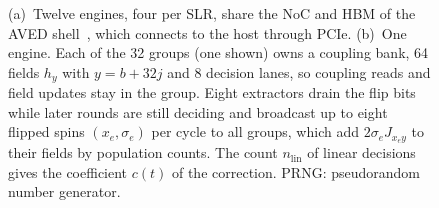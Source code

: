\begin{figure}[t]
\caption{(a)~Twelve engines, four per SLR, share the NoC and HBM of the AVED shell~\cite{amd_aved}, which connects to the host through PCIe. (b)~One engine. Each of the 32 groups (one shown) owns a coupling bank, 64 fields $h_y$ with $y=b+32j$ and 8 decision lanes, so coupling reads and field updates stay in the group. Eight extractors drain the flip bits while later rounds are still deciding and broadcast up to eight flipped spins $(x_e,\sigma_e)$ per cycle to all groups, which add $2\sigma_e J_{x_e y}$ to their fields by population counts. The count $n_{\mathrm{lin}}$ of linear decisions gives the coefficient $c(t)$ of the correction. PRNG: pseudorandom number generator.}
\label{fig:arch}
\vspace{-0.6em}%
\end{figure}

